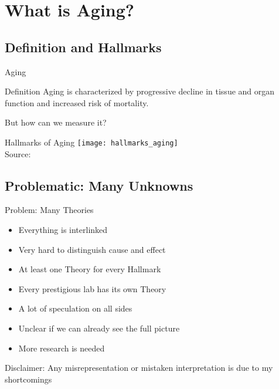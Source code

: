 \section{What is Aging?}

\subsection{Definition and Hallmarks}

\begin{frame}[c]{Aging}
    \large

    \begin{block}{Definition \cite{sen2016epigenetic}}
        Aging is characterized by progressive decline in tissue and organ
        function and increased risk of mortality.
    \end{block}
    \pause
    But how can we measure it?
\end{frame}


\begin{frame}[c]{Hallmarks of Aging}
    \texttt{[image: hallmarks\_aging]} \\
    Source: \cite{lopez2013hallmarks}
\end{frame}

\subsection{Problematic: Many Unknowns}

\begin{frame}[c]{Problem: Many Theories}
    \large
    \begin{itemize}[<+(1)->]
        \item Everything is interlinked
        \item Very hard to distinguish cause and effect
        \item At least one Theory for every Hallmark
        \item Every prestigious lab has its own Theory
        \item A lot of speculation on all sides
        \item Unclear if we can already see the full picture
        \item More research is needed
    \end{itemize}
\end{frame}

\addtocounter{framenumber}{1}
\begin{frame}[standout]
    Disclaimer: Any misrepresentation or mistaken interpretation is due to my shortcomings
\end{frame}
